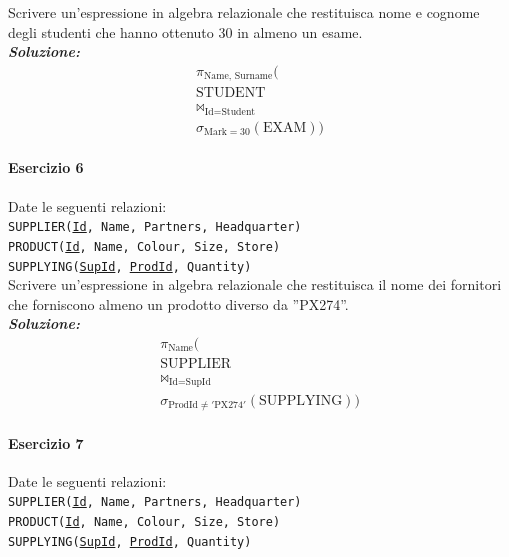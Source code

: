 \documentclass[12pt]{extarticle}
\begin{document}
\noindent Scrivere un'espressione in algebra relazionale che restituisca nome e cognome degli studenti che hanno ottenuto 30 in almeno un esame.\\

\noindent \textbf{\textit{Soluzione:}}
\[
\begin{gathered}
\pi_{\text{Name, Surname}} \Big( \\
\text{STUDENT} \\
\bowtie_{\text{Id} = \text{Student}} \\
\sigma_{\text{Mark} = 30}(\text{EXAM}) \Big)
\end{gathered}
\]

\vspace{1em}

\paragraph{Esercizio 6} Date le seguenti relazioni:\\

\noindent \texttt{SUPPLIER(\underline{Id}, Name, Partners, Headquarter)}\\
\texttt{PRODUCT(\underline{Id}, Name, Colour, Size, Store)}\\
\texttt{SUPPLYING(\underline{SupId}, \underline{ProdId}, Quantity)}\\[0.5em]

\noindent Scrivere un'espressione in algebra relazionale che restituisca il nome dei fornitori che forniscono almeno un prodotto diverso da ''PX274''.\\

\noindent \textbf{\textit{Soluzione:}}
\[
\begin{gathered}
\pi_{\text{Name}} \Big( \\
\text{SUPPLIER} \\
\bowtie_{\text{Id} = \text{SupId}} \\
\sigma_{\text{ProdId} \neq '\text{PX274}'}(\text{SUPPLYING}) \Big)
\end{gathered}
\]

\vspace{1em}

\paragraph{Esercizio 7} Date le seguenti relazioni:\\

\noindent \texttt{SUPPLIER(\underline{Id}, Name, Partners, Headquarter)}\\
\texttt{PRODUCT(\underline{Id}, Name, Colour, Size, Store)}\\
\texttt{SUPPLYING(\underline{SupId}, \underline{ProdId}, Quantity)}\\[0.5em]
\end{document}
